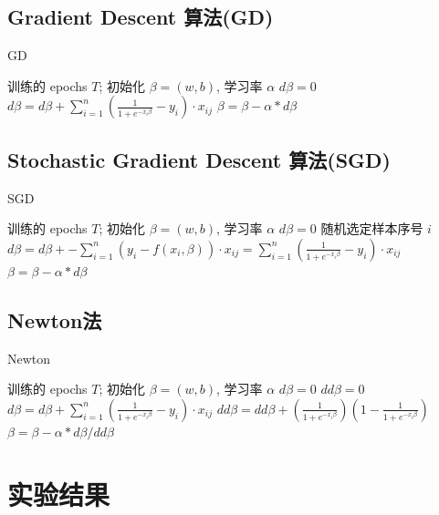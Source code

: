 \documentclass[UTF8]{article}
\begin{document}
\subsection{Gradient Descent 算法(GD)}
\begin{algorithm}[H]
	\caption{GD}
	\begin{algorithmic}[1] %
		\Require 训练的 epochs $T$; 初始化 $\beta=(w,b)$, 学习率 $\alpha$
			\State $d\beta = 0$
				\State $d\beta = d\beta + \sum\limits_{i=1}^n\left(\frac{1}{1+e^{-x_i\beta}}-y_i\right)\cdot x_{ij}$
			\EndFor
			\State $\beta = \beta - \alpha * d\beta$
		\EndFor
	\end{algorithmic}
\end{algorithm}
\subsection{Stochastic Gradient Descent 算法(SGD)}
\begin{algorithm}[H]
	\caption{SGD}
	\begin{algorithmic}[1] %
		\Require 训练的 epochs $T$; 初始化 $\beta=(w,b)$, 学习率 $\alpha$
			\State $d\beta = 0$
			\State 随机选定样本序号 $i$
			\State $d\beta = d\beta + -\sum\limits_{i=1}^n(y_i-f(x_i,\beta))\cdot x_{ij}=\sum\limits_{i=1}^n\left(\frac{1}{1+e^{-x_i\beta}}-y_i\right)\cdot x_{ij}$
			\State $\beta = \beta - \alpha * d\beta$
		\EndFor
	\end{algorithmic}
\end{algorithm}
\subsection{Newton法}
\begin{algorithm}[H]
	\caption{Newton}
	\begin{algorithmic}[1] %
		\Require 训练的 epochs $T$; 初始化 $\beta=(w,b)$, 学习率 $\alpha$
			\State $d\beta = 0$
			\State $dd\beta=0$
				\State $d\beta = d\beta + \sum\limits_{i=1}^n\left(\frac{1}{1+e^{-x_i\beta}}-y_i\right)\cdot x_{ij}$
				\State $dd\beta = dd\beta + \left(\frac{1}{1+e^{-x_i\beta}}\right)\left(1-\frac{1}{1+e^{-x_i\beta}}\right)$
			\EndFor
			\State $\beta = \beta - \alpha * d\beta/dd\beta$
		\EndFor
	\end{algorithmic}
\end{algorithm}


\section{实验结果}
\end{document}
